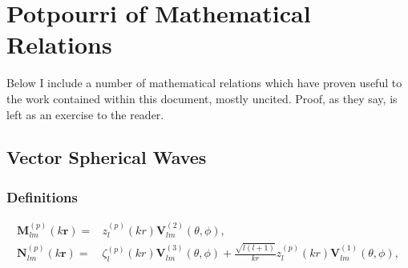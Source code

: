 \chapter[Potpourri of Mathematical Relations][Potpourri of Mathematical Relations]{Potpourri of Mathematical Relations} \label{ap:Math} \raggedbottom
%
Below I include a number of mathematical relations which have proven useful to the work contained within this document, mostly uncited. Proof, as they say, is left as an exercise to the reader.

%

\section{Vector Spherical Waves}

\subsection{Definitions}
%
\begin{subequations}
\begin{align}
\boldsymbol{M}_{l m}^{(p)}(k \boldsymbol{r}) = & z_{l}^{(p)}(kr) \boldsymbol{V}_{lm}^{(2)}(\theta, \phi),
\\
\boldsymbol{N}_{l m}^{(p)}(k \boldsymbol{r}) = & \zeta_{l}^{(p)}(kr) \boldsymbol{V}_{lm}^{(3)}(\theta, \phi) + \frac{\sqrt{l(l+1)}}{kr} z_{l}^{(p)}(kr) \boldsymbol{V}_{lm}^{(1)}(\theta, \phi),
\end{align}
\end{subequations}

